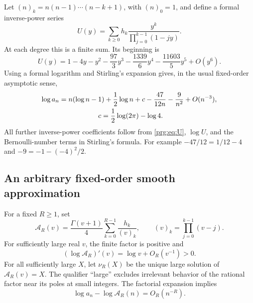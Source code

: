 \documentclass[11pt,letterpaper]{article}
\numberwithin{equation}{section}
\theoremstyle{definition}\newtheorem{definition}[theorem]{Definition}
\theoremstyle{remark}\newtheorem{remark}[theorem]{Remark}
\begin{document}
Let $(n)_k=n(n-1)\cdots(n-k+1)$, with $(n)_0=1$, and define a
formal inverse-power series
\begin{equation}\label{prg:eq:U}
 U(y)=\sum_{k\geq0}h_k\frac{y^k}{\prod_{j=0}^{k-1}(1-jy)}.
\end{equation}
At each degree this is a finite sum. Its beginning is
\begin{equation}\label{prg:eq:Ubegin}
 U(y)=1-4y-y^2-\frac{97}{3}y^3-\frac{1339}{6}y^4
                         -\frac{11603}{5}y^5+O(y^6).
\end{equation}
Using a formal logarithm and Stirling's expansion gives, in the
usual fixed-order asymptotic sense,
\begin{align}\label{prg:eq:logexp}
 \log a_n={}&n(\log n-1)+\frac12\log n+c
            -\frac{47}{12n}-\frac9{n^2}+O(n^{-3}),\\
 &\hspace{15mm}c=\frac12\log(2\pi)-\log4.\nonumber
\end{align}
All further inverse-power coefficients follow from \eqref{prg:eq:U},
$\log U$, and the Bernoulli-number terms in Stirling's formula.
For example $-47/12=1/12-4$ and $-9=-1-(-4)^2/2$.

\subsection{An arbitrary fixed-order smooth approximation}
For a fixed $R\geq1$, set
\begin{equation}\label{prg:eq:AR}
 \mathcal A_R(v)=\frac{\Gamma(v+1)}4
       \sum_{k=0}^{R-1}\frac{h_k}{(v)_k},
 \qquad (v)_k=\prod_{j=0}^{k-1}(v-j).
\end{equation}
For sufficiently large real $v$, the finite factor is positive and
\begin{equation}\label{prg:eq:slope}
 (\log\mathcal A_R)'(v)=\log v+O_R(v^{-1})>0.
\end{equation}
For all sufficiently large $X$, let $\nu_R(X)$ be the unique large
solution of $\mathcal A_R(v)=X$. The qualifier ``large'' excludes
irrelevant behavior of the rational factor near its poles at small
integers. The factorial expansion implies
\begin{equation}\label{prg:eq:logerror}
 \log a_n-\log\mathcal A_R(n)=O_R(n^{-R}).
\end{equation}
\end{document}

